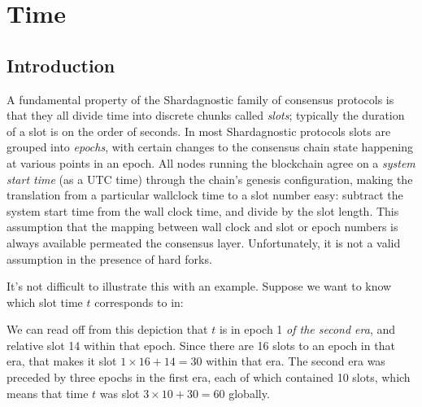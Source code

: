 \newcommand{\timeconv}[2]{\ensuremath{\mathtt{Conv}_{#1}(#2)}}
\newcommand{\applyBlocks}[2]{\ensuremath{\mathtt{apply}_\mathit{#1}(#2)}}
\newcommand{\ledgertip}[1]{\ensuremath{\mathtt{tip}(#1)}}
\newcommand{\switch}[3]{\ensuremath{\mathtt{switch}_{(\mathit{#1},\;\mathit{#2})}(#3)}}

\chapter{Time}
\label{time}

\section{Introduction}
\label{time:introduction}

A fundamental property of the Shardagnostic family of consensus protocols is that
they all divide time into discrete chunks called \emph{slots}; typically the
duration of a slot is on the order of seconds. In most Shardagnostic protocols slots
are grouped into \emph{epochs}, with certain changes to the consensus chain
state happening at various points in an epoch. All nodes running the blockchain
agree on a \emph{system start time} (as a UTC time) through the chain's genesis
configuration, making the translation from a particular wallclock time to a slot
number easy: subtract the system start time from the wall clock time, and
divide by the slot length. This assumption that the mapping between wall clock
and slot or epoch numbers is always available permeated the consensus layer.
Unfortunately, it is not a valid assumption in the presence of hard forks.

It's not difficult to illustrate this with an example. Suppose we want to know
which slot time $t$ corresponds to in:
%
\begin{center}
\end{center}
%
We can read off from this depiction that $t$ is in epoch 1 \emph{of the second
era}, and relative slot 14 within that epoch. Since there are 16 slots to an
epoch in that era, that makes it slot $1 \times 16 + 14 = 30$ within that era.
The second era was preceded by three epochs in the first era, each of which
contained 10 slots, which means that time $t$ was slot $3 \times 10 + 30 = 60$
globally.

